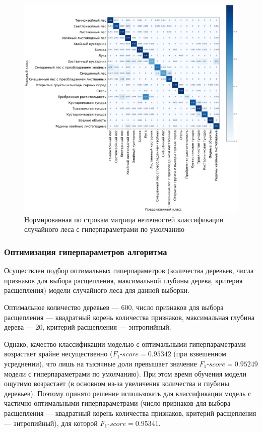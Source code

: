 \documentclass[14pt, a4paper, oneside]{extarticle}
\begin{document}
\begin{figure}[H]
    \caption{Нормированная по строкам матрица неточностей классификации случайного леса с гиперпараметрами по умолчанию}
    \centering
    \includegraphics[scale=0.33]{confusion-matrix-2}
\end{figure}

\subsubsection{Оптимизация гиперпараметров алгоритма}
Осуществлен подбор оптимальных гиперпараметров (количества деревьев, числа признаков для выбора расщепления, максимальной глубины дерева, критерия расщепления) модели случайного леса для данной выборки.

Оптимальное количество деревьев --- 600, число признаков для выбора расщепления --- квадратный корень количества признаков, максимальная глубина дерева --- 20, критерий расщепления --- энтропийный.

Однако, качество классификации моделью с оптимальными гиперпараметрами возрастает крайне несущественно ($F_1\mbox{-}score = 0.95342$ (при взвешенном усреднении), что лишь на тысячные доли превышает значение $F_1\mbox{-}score = 0.95249$ модели с гиперпараметрами по умолчанию). При этом время обучения модели ощутимо возрастает (в основном из-за увеличения количества и глубины деревьев). Поэтому принято решение использовать для классификации модель с частично оптимальными гиперпараметрами (число признаков для выбора расщепления --- квадратный корень количества признаков, критерий расщепления --- энтропийный), для которой $F_1\mbox{-}score = 0.95341$.
\end{document}
